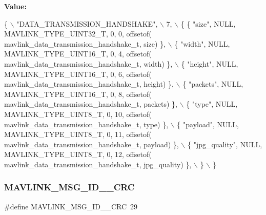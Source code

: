 {\bfseries Value\+:}
\begin{DoxyCode}
\{ \(\backslash\)
    \textcolor{stringliteral}{"DATA\_TRANSMISSION\_HANDSHAKE"}, \(\backslash\)
    7, \(\backslash\)
    \{  \{ \textcolor{stringliteral}{"size"}, NULL, MAVLINK_TYPE_UINT32_T, 0, 0, offsetof(
      mavlink_data_transmission_handshake_t, size) \}, \(\backslash\)
         \{ \textcolor{stringliteral}{"width"}, NULL, MAVLINK_TYPE_UINT16_T, 0, 4, offsetof(
      mavlink_data_transmission_handshake_t, width) \}, \(\backslash\)
         \{ \textcolor{stringliteral}{"height"}, NULL, MAVLINK_TYPE_UINT16_T, 0, 6, offsetof(
      mavlink_data_transmission_handshake_t, height) \}, \(\backslash\)
         \{ \textcolor{stringliteral}{"packets"}, NULL, MAVLINK_TYPE_UINT16_T, 0, 8, offsetof(
      mavlink_data_transmission_handshake_t, packets) \}, \(\backslash\)
         \{ \textcolor{stringliteral}{"type"}, NULL, MAVLINK_TYPE_UINT8_T, 0, 10, offsetof(
      mavlink_data_transmission_handshake_t, type) \}, \(\backslash\)
         \{ \textcolor{stringliteral}{"payload"}, NULL, MAVLINK_TYPE_UINT8_T, 0, 11, offsetof(
      mavlink_data_transmission_handshake_t, payload) \}, \(\backslash\)
         \{ \textcolor{stringliteral}{"jpg\_quality"}, NULL, MAVLINK_TYPE_UINT8_T, 0, 12, offsetof(
      mavlink_data_transmission_handshake_t, jpg\_quality) \}, \(\backslash\)
         \} \(\backslash\)
\}
\end{DoxyCode}
\mbox{\label{mavlink__msg__data__transmission__handshake_8h_a1236ec21a40d72352326ecdd58674904}} 
\subsubsection{M\+A\+V\+L\+I\+N\+K\+\_\+\+M\+S\+G\+\_\+\+I\+D\+\_\+\_\+\+C\+RC}
{\footnotesize\ttfamily \#define M\+A\+V\+L\+I\+N\+K\+\_\+\+M\+S\+G\+\_\+\+I\+D\+\_\+\_\+\+C\+RC~29}

\mbox{\label{mavlink__msg__data__transmission__handshake_8h_a0be6ba130179e6605d3946925890f3ee}} 
